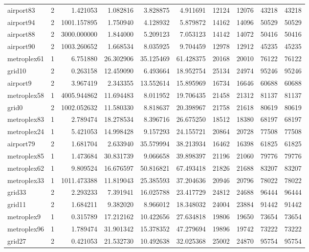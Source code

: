 \begin{longtable}{|l|r|r|r|r|r|r|r|r|r|}
airport83 & 2 & 1.421053 & 1.082816 & 3.828875 & 4.911691 & 12124 & 12076 & 43218 & 43218 \\
airport94 & 2 & 1001.157895 & 1.750940 & 4.128932 & 5.879872 & 14162 & 14096 & 50529 & 50529 \\
airport88 & 2 & 3000.000000 & 1.844000 & 5.209123 & 7.053123 & 14142 & 14072 & 50416 & 50416 \\
airport90 & 2 & 1003.260652 & 1.668534 & 8.035925 & 9.704459 & 12978 & 12912 & 45235 & 45235 \\
metroplex61 & 1 & 6.751880 & 26.302906 & 35.125469 & 61.428375 & 20168 & 20010 & 76122 & 76122 \\
grid10 & 2 & 0.263158 & 12.459090 & 6.493664 & 18.952754 & 25134 & 24974 & 95246 & 95246 \\
airport9 & 2 & 3.967419 & 2.343355 & 13.552614 & 15.895969 & 16734 & 16646 & 60688 & 60688 \\
metroplex58 & 1 & 4005.944862 & 11.694483 & 8.011952 & 19.706435 & 21458 & 21312 & 81137 & 81137 \\
grid0 & 2 & 1002.052632 & 11.580330 & 8.818637 & 20.398967 & 21758 & 21618 & 80619 & 80619 \\
metroplex83 & 1 & 2.789474 & 18.278534 & 8.396716 & 26.675250 & 18512 & 18380 & 68197 & 68197 \\
metroplex24 & 1 & 5.421053 & 14.998428 & 9.157293 & 24.155721 & 20864 & 20728 & 77508 & 77508 \\
airport79 & 2 & 1.681704 & 2.633940 & 35.579994 & 38.213934 & 16462 & 16398 & 61825 & 61825 \\
metroplex85 & 1 & 1.473684 & 30.831739 & 9.066658 & 39.898397 & 21196 & 21060 & 79776 & 79776 \\
metroplex62 & 1 & 9.809524 & 16.676597 & 50.816821 & 67.493418 & 21826 & 21688 & 83207 & 83207 \\
metroplex33 & 1 & 1011.473388 & 11.819043 & 25.385593 & 37.204636 & 20946 & 20796 & 78022 & 78022 \\
grid33 & 2 & 2.293233 & 7.391941 & 16.025788 & 23.417729 & 24812 & 24688 & 96444 & 96444 \\
grid11 & 2 & 1.684211 & 9.382020 & 8.966012 & 18.348032 & 24004 & 23884 & 91442 & 91442 \\
metroplex9 & 1 & 0.315789 & 17.212162 & 10.422656 & 27.634818 & 19806 & 19650 & 73654 & 73654 \\
metroplex96 & 1 & 1.789474 & 31.901342 & 15.378352 & 47.279694 & 19896 & 19742 & 73222 & 73222 \\
grid27 & 2 & 0.421053 & 21.532730 & 10.492638 & 32.025368 & 25002 & 24870 & 95754 & 95754 \\

\end{longtable}
